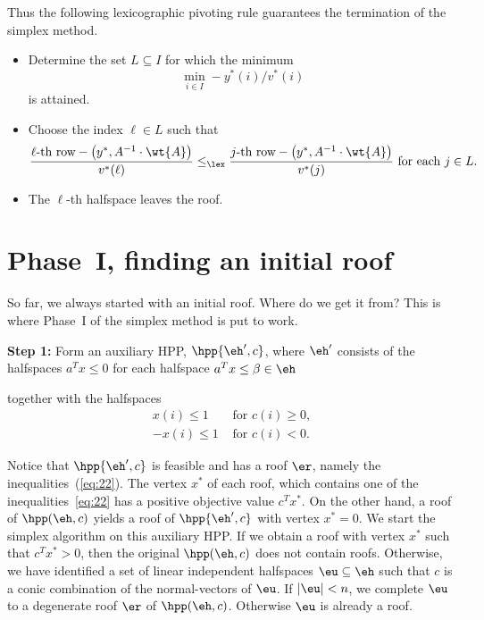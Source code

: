 Thus the following lexicographic  pivoting rule guarantees the
termination of the simplex method. 

\begin{itemize}
\item   Determine the set $L\subseteq I$ for which the minimum 
  \begin{displaymath}
    \min_{i \in I} -  y^*(i)/v^*(i)
  \end{displaymath}
  is attained.  
  \item Choose the index $\ell \in L$  such that 
  \begin{displaymath}
    \frac{\ell\mbox{-th row} - \left( y^*, A^{-1}\cdot\wt{A}\right)}{v^*(\ell)} \leq_\lex 
    \frac{j\mbox{-th row} - \left( y^*, A^{-1} \cdot \wt{A}\right)}{v^*(j)} \mbox{ for each } j \in L.
  \end{displaymath}
  \item The $\ell$-th halfspace leaves the roof. 
\end{itemize}



\section{Phase~I, finding an initial roof}
\label{sec:phase-i-finding}


So far, we always started with an initial roof. Where do we get 
it  from?  This is where Phase~I of the simplex method is put to
work. 

{\bf Step 1:} Form an auxiliary HPP, $\hpp{\eh',c}$, where $\eh'$
consists of the halfspaces $a^Tx\leq0$ for each halfspace $a^Tx \leq \beta \in\eh$ 

together with the halfspaces 
\begin{equation}
  \label{eq:22}
  \begin{array}{ll}
    x(i) \leq 1 & \mbox{ for } c(i)\geq0,\\
    -x(i)\leq 1 & \mbox{ for } c(i)<0. 
  \end{array}
\end{equation}

Notice that $\hpp{\eh',c}$ is feasible and has a roof $\er$, namely
the inequalities~(\ref{eq:22}).  The vertex $x^*$ of each roof,
which contains one of the inequalities~\eqref{eq:22} has a positive
objective value $c^Tx^*$. On the other hand, a roof of
$\hpp(\eh,c)$ yields a roof of $\hpp{\eh',c}$ with vertex $x^*=0$.
We start the simplex algorithm on this auxiliary HPP. If we obtain a
roof with vertex $x^*$ such that $c^Tx^*>0$, then the original
$\hpp(\eh,c)$ does not contain roofs. Otherwise, we have identified
a set of linear independent halfspaces $\eu \subseteq\eh$ such that $c$ is a
conic combination of the normal-vectors of $\eu$. If $|\eu|<n$,  we complete
$\eu$ to a degenerate roof $\er$ of $\hpp(\eh,c)$. Otherwise $\eu$
is already a roof. 


